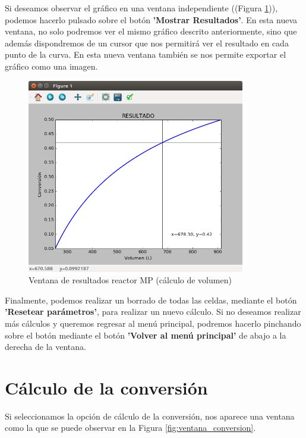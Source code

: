 Si deseamos observar el gráfico en una ventana independiente ((Figura \ref{fig:ventana_graficas_volumen})), podemos hacerlo pulsado sobre el botón \textbf{'Mostrar Resultados'}. En esta nueva ventana, no solo podremos ver el mismo gráfico descrito anteriormente, sino que además dispondremos de un cursor que nos permitirá ver el resultado en cada punto de la curva. En esta nueva ventana también se nos permite exportar el gráfico como una imagen.

\begin{figure}[h!]
	\begin{center}
		\includegraphics[width=0.85\textwidth]{./imagenes/reactor_fp/mezcla_perfecta2.png}\caption{Ventana de resultados reactor MP (cálculo de volumen)}\label{fig:ventana_graficas_volumen}
	\end{center}
\end{figure}

Finalmente, podemos realizar un borrado de todas las celdas, mediante el botón \textbf{'Resetear parámetros'}, para realizar un nuevo cálculo. Si no deseamos realizar más cálculos y queremos regresar al menú principal, podremos hacerlo pinchando sobre el botón mediante el botón \textbf{'Volver al menú principal'} de abajo a la derecha de la ventana.


\section{Cálculo de la conversión}
Si seleccionamos la opción de cálculo de la conversión, nos aparece una ventana como la que se puede observar en la Figura \ref{fig:ventana_conversion}.


